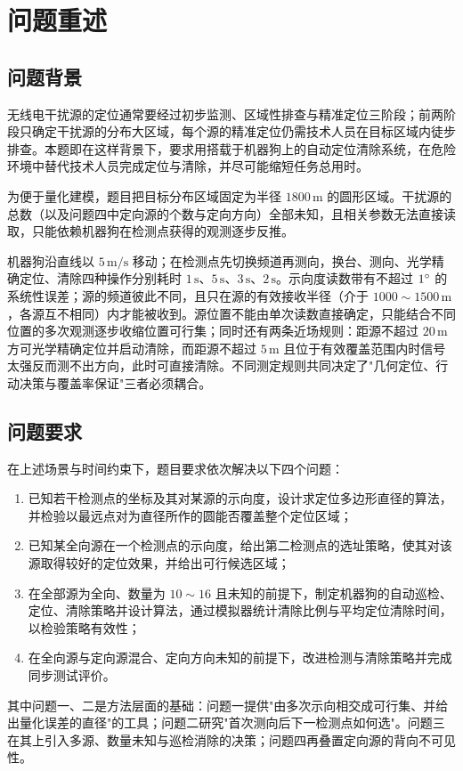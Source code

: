 \section{问题重述}

\subsection{问题背景}

无线电干扰源的定位通常要经过初步监测、区域性排查与精准定位三阶段；前两阶段只确定干扰源的分布大区域，每个源的精准定位仍需技术人员在目标区域内徒步排查\cite{contestProblem}。本题即在这样背景下，要求用搭载于机器狗上的自动定位清除系统，在危险环境中替代技术人员完成定位与清除，并尽可能缩短任务总用时。

为便于量化建模，题目把目标分布区域固定为半径 \(1800\,\mathrm{m}\) 的圆形区域。干扰源的总数（以及问题四中定向源的个数与定向方向）全部未知，且相关参数无法直接读取，只能依赖机器狗在检测点获得的观测逐步反推。

机器狗沿直线以 \(5\,\mathrm{m/s}\) 移动；在检测点先切换频道再测向，换台、测向、光学精确定位、清除四种操作分别耗时 \(1\,\mathrm{s}\)、\(5\,\mathrm{s}\)、\(3\,\mathrm{s}\)、\(2\,\mathrm{s}\)。示向度读数带有不超过 \(1^{\circ}\) 的系统性误差；源的频道彼此不同，且只在源的有效接收半径（介于 \(1000\sim1500\,\mathrm{m}\)，各源互不相同）内才能被收到。源位置不能由单次读数直接确定，只能结合不同位置的多次观测逐步收缩位置可行集；同时还有两条近场规则：距源不超过 \(20\,\mathrm{m}\) 方可光学精确定位并启动清除，而距源不超过 \(5\,\mathrm{m}\) 且位于有效覆盖范围内时信号太强反而测不出方向，此时可直接清除。不同测定规则共同决定了"几何定位、行动决策与覆盖率保证"三者必须耦合。

\subsection{问题要求}

在上述场景与时间约束下，题目要求依次解决以下四个问题：

\begin{enumerate}
  \item 已知若干检测点的坐标及其对某源的示向度，设计求定位多边形直径的算法，并检验以最远点对为直径所作的圆能否覆盖整个定位区域；
  \item 已知某全向源在一个检测点的示向度，给出第二检测点的选址策略，使其对该源取得较好的定位效果，并给出可行候选区域；
  \item 在全部源为全向、数量为 \(10\sim16\) 且未知的前提下，制定机器狗的自动巡检、定位、清除策略并设计算法，通过模拟器统计清除比例与平均定位清除时间，以检验策略有效性；
  \item 在全向源与定向源混合、定向方向未知的前提下，改进检测与清除策略并完成同步测试评价。
\end{enumerate}

其中问题一、二是方法层面的基础：问题一提供"由多次示向相交成可行集、并给出量化误差的直径"的工具；问题二研究"首次测向后下一检测点如何选"。问题三在其上引入多源、数量未知与巡检消除的决策；问题四再叠置定向源的背向不可见性。
